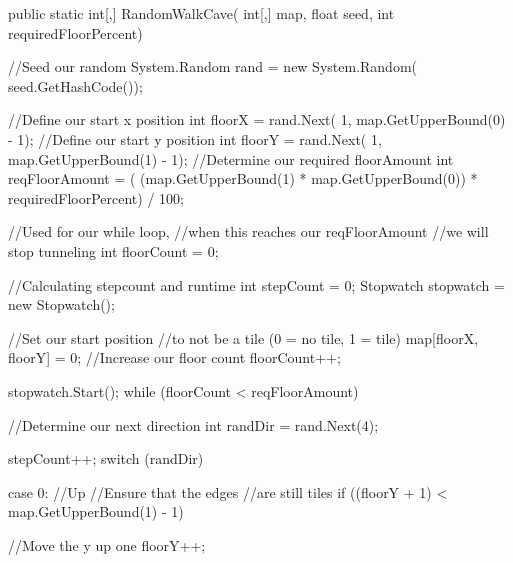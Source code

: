 \begin{java}
public static int[,] RandomWalkCave(
    int[,] map, float seed, int requiredFloorPercent)
{
    //Seed our random
    System.Random rand = new System.Random(
        seed.GetHashCode());

    //Define our start x position
    int floorX = rand.Next(
        1, map.GetUpperBound(0) - 1);
    //Define our start y position
    int floorY = rand.Next(
        1, map.GetUpperBound(1) - 1);
    //Determine our required floorAmount
    int reqFloorAmount = (
        (map.GetUpperBound(1) * map.GetUpperBound(0))
        * requiredFloorPercent) / 100;

    //Used for our while loop,
    //when this reaches our reqFloorAmount
    //we will stop tunneling
    int floorCount = 0;

    //Calculating stepcount and runtime
    int stepCount = 0;
    Stopwatch stopwatch = new Stopwatch();

    //Set our start position
    //to not be a tile (0 = no tile, 1 = tile)
    map[floorX, floorY] = 0;
    //Increase our floor count
    floorCount++;

    stopwatch.Start();
    while (floorCount < reqFloorAmount)
    {
        //Determine our next direction
        int randDir = rand.Next(4);

        stepCount++;
        switch (randDir)
        {
            case 0: //Up
                //Ensure that the edges
                //are still tiles
                if ((floorY + 1) < 
                    map.GetUpperBound(1) - 1)
                {
                    //Move the y up one
                    floorY++;

}}}}
\end{java}
